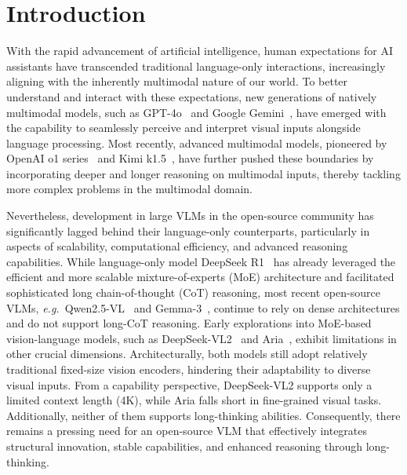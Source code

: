 \documentclass{article}
\newcommand{\citep}[1]{\parencite{#1}}
\begin{document}
\section{Introduction}


With the rapid advancement of artificial intelligence, 
human expectations for AI assistants have transcended traditional language-only interactions, 
increasingly aligning with the inherently multimodal nature of our world. 
To better understand and interact with these expectations, new generations of natively multimodal models, such as GPT-4o~\citep{openai2024gpt4ocard} and Google Gemini~\citep{geminiteam2024gemini15unlockingmultimodal}, have emerged with the capability to seamlessly perceive and interpret visual inputs alongside language processing.
Most recently, advanced multimodal models, pioneered by OpenAI o1 series~\citep{o12024} and Kimi k1.5~\citep{team2025kimi}, have further pushed these boundaries by incorporating deeper and longer reasoning on multimodal inputs, thereby tackling more complex problems in the multimodal domain. 



Nevertheless, development in large VLMs in the open-source community has significantly lagged behind their language-only counterparts, particularly in aspects of scalability, computational efficiency, and advanced reasoning capabilities. While language-only model DeepSeek R1~\citep{deepseekai2025deepseekr1incentivizingreasoningcapability} has already leveraged the efficient and more scalable mixture-of-experts (MoE) architecture and facilitated sophisticated long chain-of-thought (CoT) reasoning, most recent open-source VLMs, \textit{e.g.}~Qwen2.5-VL~\citep{bai2025qwen25vltechnicalreport} and Gemma-3~\citep{gemmateam2025gemma3technicalreport}, continue to rely on dense architectures and do not support long-CoT reasoning. Early explorations into MoE-based vision-language models, such as DeepSeek-VL2~\citep{wu2024deepseekvl2mixtureofexpertsvisionlanguagemodels} and Aria~\citep{li2024ariaopenmultimodalnative}, exhibit limitations in other crucial dimensions. Architecturally, both models still adopt relatively traditional fixed-size vision encoders, hindering their adaptability to diverse visual inputs. From a capability perspective, DeepSeek-VL2 supports only a limited context length (4K), while Aria falls short in fine-grained visual tasks. Additionally, neither of them supports long-thinking abilities. Consequently, there remains a pressing need for an open-source VLM that effectively integrates structural innovation, stable capabilities, and enhanced reasoning through long-thinking.
\end{document}
